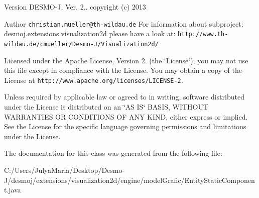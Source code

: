 \begin{DoxyVersion}{Version}
D\-E\-S\-M\-O-\/\-J, Ver. 2.. copyright (c) 2013 
\end{DoxyVersion}
\begin{DoxyAuthor}{Author}
{\tt christian.\-mueller@th-\/wildau.\-de} For information about subproject\-: desmoj.\-extensions.\-visualization2d please have a look at\-: {\tt http\-://www.\-th-\/wildau.\-de/cmueller/\-Desmo-\/\-J/\-Visualization2d/}
\end{DoxyAuthor}
Licensed under the Apache License, Version 2. (the \char`\"{}\-License\char`\"{}); you may not use this file except in compliance with the License. You may obtain a copy of the License at {\tt http\-://www.\-apache.\-org/licenses/\-L\-I\-C\-E\-N\-S\-E-\/2.}

Unless required by applicable law or agreed to in writing, software distributed under the License is distributed on an \char`\"{}\-A\-S I\-S\char`\"{} B\-A\-S\-I\-S, W\-I\-T\-H\-O\-U\-T W\-A\-R\-R\-A\-N\-T\-I\-E\-S O\-R C\-O\-N\-D\-I\-T\-I\-O\-N\-S O\-F A\-N\-Y K\-I\-N\-D, either express or implied. See the License for the specific language governing permissions and limitations under the License. 

The documentation for this class was generated from the following file\-:\begin{DoxyCompactItemize}
\item 
C\-:/\-Users/\-Julya\-Maria/\-Desktop/\-Desmo-\/\-J/desmoj/extensions/visualization2d/engine/model\-Grafic/Entity\-Static\-Component.\-java\end{DoxyCompactItemize}
